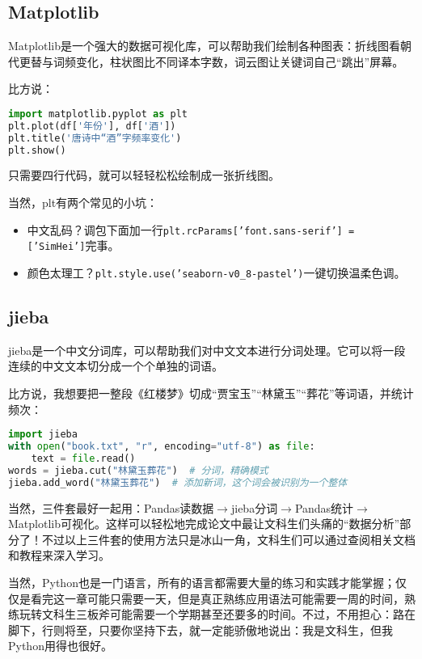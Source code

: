 \documentclass[../main.tex]{subfiles}
\begin{document}
\subsection{Matplotlib}

Matplotlib是一个强大的数据可视化库，可以帮助我们绘制各种图表：折线图看朝代更替与词频变化，柱状图比不同译本字数，词云图让关键词自己“跳出”屏幕。

比方说：
\begin{lstlisting}[language=python]
import matplotlib.pyplot as plt
plt.plot(df['年份'], df['酒'])
plt.title('唐诗中“酒”字频率变化')
plt.show()
\end{lstlisting}

只需要四行代码，就可以轻轻松松绘制成一张折线图。

当然，plt有两个常见的小坑：
\begin{itemize}
    \item 中文乱码？调包下面加一行\texttt{plt.rcParams['font.sans-serif'] = ['SimHei']}完事。
    \item 颜色太理工？\texttt{plt.style.use('seaborn-v0\_8-pastel')}一键切换温柔色调。
\end{itemize}

\subsection{jieba}
jieba是一个中文分词库，可以帮助我们对中文文本进行分词处理。它可以将一段连续的中文文本切分成一个个单独的词语。

比方说，我想要把一整段《红楼梦》切成“贾宝玉”“林黛玉”“葬花”等词语，并统计频次：
\begin{lstlisting}[language=python]
import jieba
with open("book.txt", "r", encoding="utf-8") as file:
    text = file.read()
words = jieba.cut("林黛玉葬花")  # 分词，精确模式
jieba.add_word("林黛玉葬花")  # 添加新词，这个词会被识别为一个整体
\end{lstlisting}

当然，三件套最好一起用：Pandas读数据$\rightarrow$jieba分词$ \rightarrow $Pandas统计$ \rightarrow $Matplotlib可视化。这样可以轻松地完成论文中最让文科生们头痛的“数据分析”部分了！不过以上三件套的使用方法只是冰山一角，文科生们可以通过查阅相关文档和教程来深入学习。

当然，Python也是一门语言，所有的语言都需要大量的练习和实践才能掌握；仅仅是看完这一章可能只需要一天，但是真正熟练应用语法可能需要一周的时间，熟练玩转文科生三板斧可能需要一个学期甚至还要多的时间。不过，不用担心：路在脚下，行则将至，只要你坚持下去，就一定能骄傲地说出：我是文科生，但我Python用得也很好。
\end{document}
